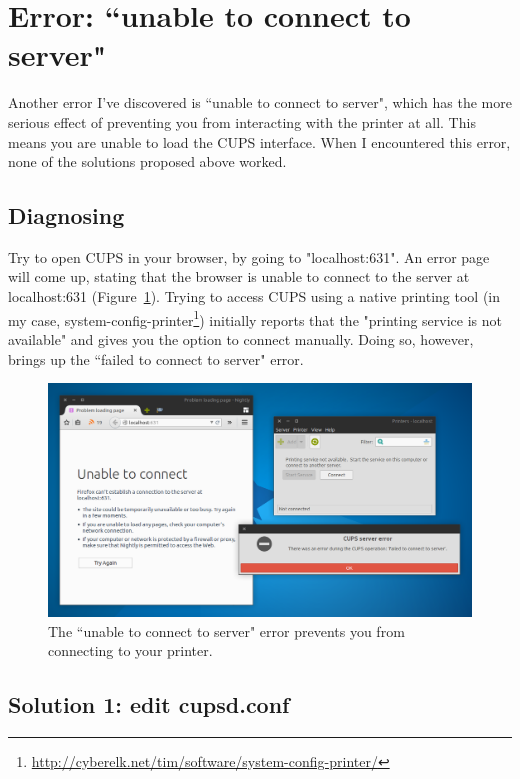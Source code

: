 \documentclass[12pt, a4paper]{article}
\begin{document}
\section*{Error: ``unable to connect to server"}

Another error I've discovered is ``unable to connect to server", which has the more serious effect of preventing you from interacting with the printer at all. This means you are unable to load the CUPS interface. When I encountered this error, none of the solutions proposed above worked.

\subsection*{Diagnosing}

Try to open CUPS in your browser, by going to "localhost:631". An error page will come up, stating that the browser is unable to connect to the server at localhost:631 (Figure~\ref{fig11}). Trying to access CUPS using a native printing tool (in my case, system-config-printer\footnote{\url{http://cyberelk.net/tim/software/system-config-printer/}}) initially reports that the "printing service is not available" and gives you the option to connect manually. Doing so, however, brings up the ``failed to connect to server" error.

\begin{figure}[!htp]
  \centering
  \includegraphics[width=1\textwidth]{imgs/unable-to-connect-to-server-1.png}
  \caption{The ``unable to connect to server" error prevents you from connecting to your printer.}
  \label{fig11}
\end{figure}

\subsection*{Solution 1: edit cupsd.conf}
\end{document}
